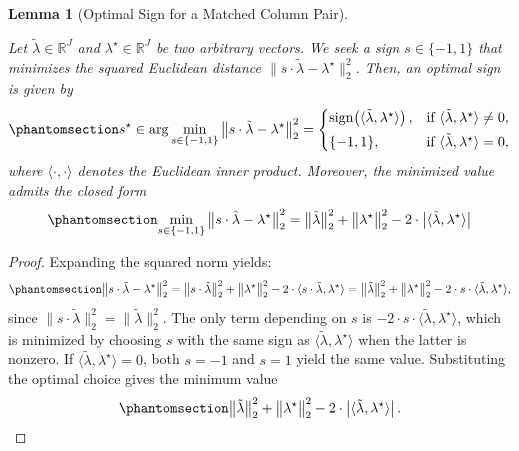 \documentclass[
  man,
  longtable,
  nolmodern,
  notxfonts,
  notimes,
  colorlinks=true,linkcolor=blue,citecolor=blue,urlcolor=blue]{apa7}
\theoremstyle{plain}
\newtheorem{lemma}{Lemma}[section]
\theoremstyle{plain}
\theoremstyle{remark}
\begin{document}
\begin{lemma}[Optimal Sign for a Matched Column
Pair]\protect\hypertarget{lem-signs}{}\label{lem-signs}

Let \(\tilde{\lambda} \in \mathbb{R}^J\) and
\(\lambda^\star \in \mathbb{R}^J\) be two arbitrary vectors. We seek a
sign \(s \in \{-1, 1\}\) that minimizes the squared Euclidean distance
\(\|s\cdot\tilde{\lambda} - \lambda^\star\|_2^2\). Then, an optimal sign
is given by \begin{equation}\phantomsection\label{eq-06}{
s^\star\in\arg\min_{s\in\{-1,1\}}\left\|s\cdot\tilde\lambda - \lambda^\star\right\|^2_2 =
\begin{cases}
\operatorname{sign}\!\left(\langle \tilde{\lambda},\lambda^\star\rangle\right), & \text{if }\langle \tilde{\lambda},\lambda^\star\rangle\neq 0,\\[3pt]
\{-1,1\}, & \text{if }\langle \tilde{\lambda},\lambda^\star\rangle = 0,
\end{cases}
}\end{equation} where \(\langle \cdot,\cdot\rangle\) denotes the
Euclidean inner product. Moreover, the minimized value admits the closed
form \begin{equation}\phantomsection\label{eq-07}{
\min_{s\in\{-1,1\}}\left\|s\cdot\tilde\lambda - \lambda^\star\right\|^2_2 = \big\|\tilde\lambda\big\|^2_2 + \big\|\lambda^\star\big\|^2_2 - 2\cdot\left|\langle\tilde\lambda,\lambda^\star\rangle\right|
}\end{equation}

\end{lemma}

\begin{proof}
Expanding the squared norm yields:
\begin{equation}\phantomsection\label{eq-08}{
\big\|s\cdot\tilde{\lambda} - \lambda^\star\big\|_2^2 = \big\|s\cdot\tilde{\lambda}\big\|_2^2 + \big\|\lambda^\star\big\|_2^2 - 2\cdot \langle s\cdot\tilde{\lambda}, \lambda^\star \rangle = \big\|\tilde{\lambda}\big\|_2^2 + \big\|\lambda^\star\big\|_2^2 - 2\cdot s\cdot \langle \tilde{\lambda}, \lambda^\star \rangle,
}\end{equation} since
\(\big\|s\cdot\tilde{\lambda}\big\|_2^2=\big\|\tilde{\lambda}\big\|_2^2\).
The only term depending on \(s\) is
\(-2\cdot s\cdot\langle \tilde{\lambda},\lambda^\star\rangle\), which is
minimized by choosing \(s\) with the same sign as
\(\langle \tilde{\lambda},\lambda^\star\rangle\) when the latter is
nonzero. If \(\langle \tilde{\lambda},\lambda^\star\rangle=0\), both
\(s=-1\) and \(s=1\) yield the same value. Substituting the optimal
choice gives the minimum value
\begin{equation}\phantomsection\label{eq-09}{
\big\|\tilde{\lambda}\big\|_2^2+\big\|\lambda^\star\big\|_2^2 - 2\cdot\left|\langle \tilde{\lambda},\lambda^\star\rangle\right|.
}\end{equation}
\end{proof}
\end{document}

